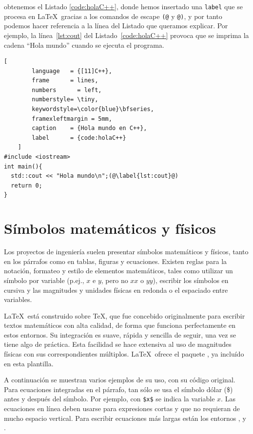 \noindent obtenemos el Listado \ref{code:holaC++}, donde hemos insertado una \texttt{label} que se procesa en \LaTeX\ gracias a los comandos de escape \texttt{(@} y \texttt{@)}, y por tanto podemos hacer referencia a la línea del Listado que queramos explicar. Por ejemplo, la línea~\ref{lst:cout} del Listado~\ref{code:holaC++} provoca que se imprima la cadena ``Hola mundo'' cuando se ejecuta el programa.

\begin{minipage}{0.96\linewidth}
\begin{center}
    \begin{lstlisting}[
        language   = {[11]C++},
        frame      = lines,
	    numbers		 = left,
		numberstyle= \tiny,
		keywordstyle=\color{blue}\bfseries,
		framexleftmargin = 5mm,
        caption    = {Hola mundo en C++},
        label      = {code:holaC++}
    ]
#include <iostream>
int main(){
  std::cout << "Hola mundo\n";(@\label{lst:cout}@)
  return 0;
}
\end{lstlisting}
\end{center}
\end{minipage}

\section{Símbolos matemáticos y físicos}
Los proyectos de ingeniería suelen presentar símbolos matemáticos y físicos, tanto en los párrafos como en tablas, figuras y ecuaciones. Existen reglas para la notación, formateo y estilo de elementos matemáticos, tales como utilizar un símbolo por variable (p.ej., $x$ e $y$, pero no $xx$ o $yy$), escribir los símbolos en cursiva y las magnitudes y unidades físicas en redonda o el espaciado entre variables.

\LaTeX\ está construido sobre \TeX, que fue concebido originalmente para escribir textos matemáticos con alta calidad, de forma que funciona perfectamente en estos entornos. Su integración es suave, rápida y sencilla de seguir, una vez se tiene algo de práctica.
Esta facilidad se hace extensiva al uso de magnitudes físicas con sus correspondientes múltiplos. \LaTeX\ ofrece el paquete , ya incluído en esta plantilla.

A continuación se muestran varios ejemplos de su uso, con su código original. Para ecuaciones integradas en el párrafo, tan sólo se usa el símbolo dólar (\$) antes y después del símbolo. Por ejemplo, con \verb|$x$| se indica la variable $x$. Las ecuaciones en línea deben usarse para expresiones cortas y que no requieran de mucho espacio vertical. Para escribir ecuaciones más largas están los entornos ,  y .

